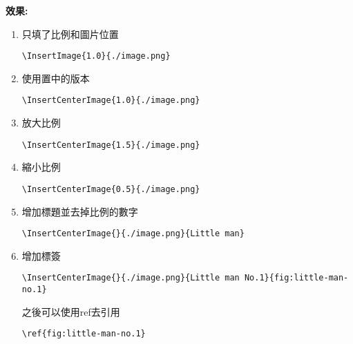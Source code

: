   {\bf 效果:}
  \begin{enumerate}
    \item
    {
      只填了比例和圖片位置\begin{verbatim}\InsertImage{1.0}{./image.png}\end{verbatim}
    } %

    \item
    {
      使用置中的版本\begin{verbatim}\InsertCenterImage{1.0}{./image.png}\end{verbatim}
    } %

    \item
    {
      放大比例\begin{verbatim}\InsertCenterImage{1.5}{./image.png}\end{verbatim}
    } %

    \newpage

    \item
    {
      縮小比例\begin{verbatim}\InsertCenterImage{0.5}{./image.png}\end{verbatim}
    } %

    \item
    {
      增加標題並去掉比例的數字\begin{verbatim}\InsertCenterImage{}{./image.png}{Little man}\end{verbatim}
    } %

    \item
    {
      增加標簽\begin{verbatim}\InsertCenterImage{}{./image.png}{Little man No.1}{fig:little-man-no.1}\end{verbatim}
      之後可以使用ref去引用\begin{verbatim}\ref{fig:little-man-no.1}\end{verbatim}

}
\end{enumerate}
